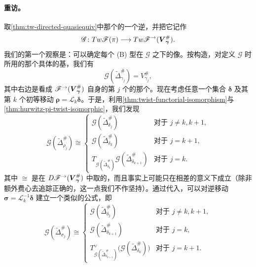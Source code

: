 \paragraph{\trMatchingCycle{}重访。}\label{sub:matching-cycles-revisited}
取\cref{thm:tw-directed-quasiequiv}中那个\trQuasiequivalence{}的一个逆，并把它记作
\begin{equation*}
\mathscr{G}\colon Tw\mathscr{F}(\pi)\longrightarrow Tw\mathscr{F}^{\rightarrow}(\boldsymbol{V}^{\#}_{\boldsymbol{\gamma}}).
\end{equation*}
我们的第一个观察是：可以确定每个 (B) 型\trEquivariant\trBrane{}在 $\mathscr{G}$ 之下的像。按构造，对定义 $\mathscr{G}$ 时所用的那个具体的基，我们有
\begin{equation*}
\mathscr{G}(\widetilde{\Delta}^{\#}_{\gamma_j})=V^{\#}_{\gamma_j},
\end{equation*}
其中右边是看成 $\mathscr{F}^{\rightarrow}(\boldsymbol{V}^{\#}_{\boldsymbol{\gamma}})$ 自身的第 $j$ 个\trObject{}的那个\trVanishingCycle。现在考虑任意一个集合 $\boldsymbol{\delta}$ 及其第 $k$ 个初等\trHurwitz{}移动 $\boldsymbol{\rho}=\mathscr{L}_k\boldsymbol{\delta}$。于是，利用\cref{thm:twist-functorial-isomorphism}与\cref{thm:hurwitz-pi-twist-isomorphic}，我们发现
\begin{equation}\label{eq:g-hurwitz-images}
\mathscr{G}(\widetilde{\Delta}^{\#}_{\rho_j})\cong
\begin{cases}
\mathscr{G}(\widetilde{\Delta}^{\#}_{\delta_j}) & \text{对于 } j\neq k,k+1,\\
\mathscr{G}(\widetilde{\Delta}^{\#}_{\delta_k}) & \text{对于 } j=k+1,\\
T_{\mathscr{G}(\widetilde{\Delta}^{\#}_{\delta_k})}\mathscr{G}(\widetilde{\Delta}^{\#}_{\delta_{k+1}}) & \text{对于 } j=k.
\end{cases}
\end{equation}
其中 $\cong$ 是在 $D\mathscr{F}^{\rightarrow}(\boldsymbol{V}^{\#}_{\boldsymbol{\gamma}})$ 中取的，而且事实上可能只在相差\trTranslation{}的意义下成立（除非额外费心去追踪正确的\trGrading{}，这一点我们不作坚持）。通过代入，可以对逆\trHurwitz{}移动 $\boldsymbol{\sigma}=\mathscr{L}_k^{-1}\boldsymbol{\delta}$ 建立一个类似的公式，即
\begin{equation*}
\mathscr{G}(\widetilde{\Delta}^{\#}_{\sigma_j})\cong
\begin{cases}
\mathscr{G}(\widetilde{\Delta}^{\#}_{\delta_j}) & \text{对于 } j\neq k,k+1,\\
\mathscr{G}(\widetilde{\Delta}^{\#}_{\delta_{k+1}}) & \text{对于 } j=k,\\
T^{\vee}_{\mathscr{G}(\widetilde{\Delta}^{\#}_{\delta_{k+1}})}\bigl(\mathscr{G}(\widetilde{\Delta}^{\#}_{\delta_k})\bigr) & \text{对于 } j=k+1.
\end{cases}
\end{equation*}
